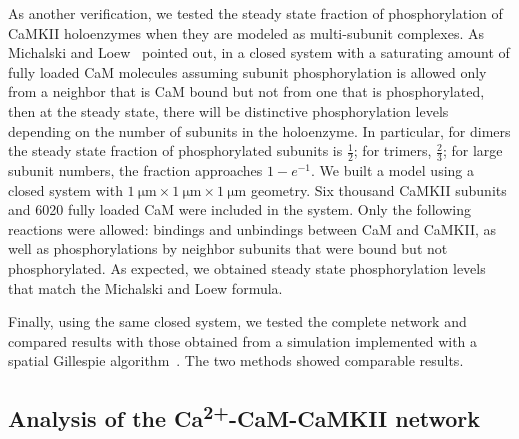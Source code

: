 \documentclass[10pt,letterpaper]{article}
\begin{document}
As another verification, we tested the steady state fraction of phosphorylation of CaMKII holoenzymes when they are modeled as multi-subunit complexes. As Michalski and Loew~\cite{Michalski:2012ds} pointed out, in a closed system with a saturating amount of fully loaded CaM molecules assuming subunit phosphorylation is allowed only from a neighbor that is CaM bound but not from one that is phosphorylated, then at the steady state, there will be distinctive phosphorylation levels depending on the number of subunits in the holoenzyme. In particular, for dimers the steady state fraction of phosphorylated subunits is $\frac{1}{2}$; for trimers, $\frac{2}{3}$; for large subunit numbers, the fraction approaches $1-e^{-1}$. We built a model using a closed system with $\SI{1}{\um}\times\SI{1}{\um}\times\SI{1}{\um}$ geometry. Six thousand CaMKII subunits and 6020 fully loaded CaM were included in the system. Only the following reactions were allowed: bindings and unbindings between CaM and CaMKII, as well as phosphorylations by neighbor subunits that were bound but not phosphorylated. As expected, we obtained steady state phosphorylation levels that match the Michalski and Loew formula.

Finally, using the same closed system, we tested the complete network and compared results with those obtained from a simulation implemented with a spatial Gillespie algorithm~\cite{Zeng:2010bq}. The two methods showed comparable results.

\subsection*{Analysis of the Ca\textsuperscript{2+}-CaM-CaMKII network}
\end{document}
